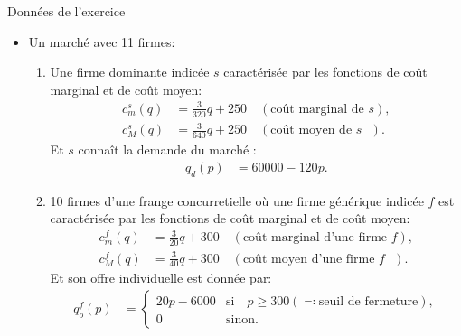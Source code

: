 \begin{frame}
  [allowframebreaks]{Données de l'exercice}
  \begin{itemize}
\item Un marché avec 11 firmes:
\begin{enumerate}[$\cdot$]
\item Une firme dominante indicée $s$ caractérisée par les fonctions de coût marginal et de coût moyen:
\begin{align}
c_m^s(q) &= \frac{3}{320}q + 250 \quad (\text{coût marginal de $s$}) \label{eq1},\\
c_M^s(q) &= \frac{3}{640}q + 250 \quad (\text{coût moyen de $s$ })\label{eq2}.
\end{align}
Et $s$ connaît la demande du marché :
\begin{align}
q_d(p) &= 60000 - 120p.\label{eq3}
\end{align}
\item 10 firmes d'une frange concurretielle où une firme générique indicée $f$ est caractérisée par les fonctions de coût marginal et de coût moyen:
\begin{align}
c_m^f (q)&= \frac{3}{20}q + 300 \quad (\text{coût marginal d'une firme $f$}) \label{eq4},\\
c_M^f(q) &= \frac{3}{40}q + 300 \quad (\text{coût moyen d'une firme  $f$ })\label{eq5}.
\end{align}
Et son offre individuelle est donnée par:
\begin{align}
q_o^f(p) &= \left\{
\begin{array}{ll}
20p-6000 & \text{si} \quad p\geq 300 (\eqqcolon \text{seuil de fermeture}), \\
0 & \text{sinon}.
\end{array}\right.
\label{eq6}
\end{align}
\end{enumerate}
\end{itemize}
\end{frame}

